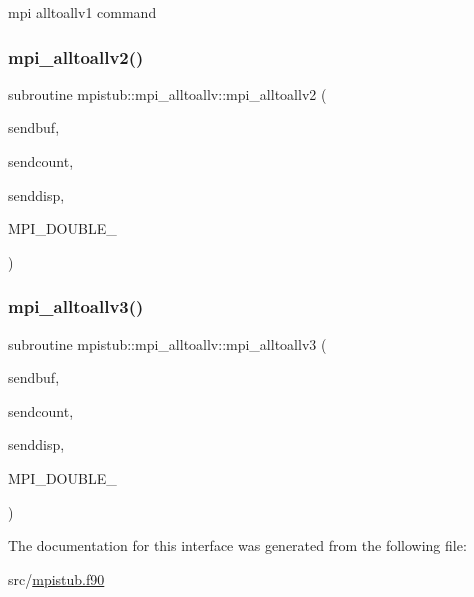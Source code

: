 mpi alltoallv1 command 

\mbox{\label{interfacempistub_1_1mpi__alltoallv_aa4b7552839c6f8cf7f1305392fac3d35}} 
\subsubsection{\texorpdfstring{mpi\_alltoallv2()}{mpi\_alltoallv2()}}
{\footnotesize\ttfamily subroutine mpistub\+::mpi\+\_\+alltoallv\+::mpi\+\_\+alltoallv2 (\begin{DoxyParamCaption}\item[{double precision, dimension(\+:)}]{sendbuf,  }\item[{integer, dimension(\+:)}]{sendcount,  }\item[{integer, dimension(\+:)}]{senddisp,  }\item[{}]{M\+P\+I\+\_\+\+D\+O\+U\+B\+L\+E\+\_\+ }\end{DoxyParamCaption})}

\mbox{\label{interfacempistub_1_1mpi__alltoallv_a0772d04d3569130dbea35245d97cfae7}} 
\subsubsection{\texorpdfstring{mpi\_alltoallv3()}{mpi\_alltoallv3()}}
{\footnotesize\ttfamily subroutine mpistub\+::mpi\+\_\+alltoallv\+::mpi\+\_\+alltoallv3 (\begin{DoxyParamCaption}\item[{integer, dimension(\+:)}]{sendbuf,  }\item[{integer, dimension(\+:)}]{sendcount,  }\item[{integer, dimension(\+:)}]{senddisp,  }\item[{}]{M\+P\+I\+\_\+\+D\+O\+U\+B\+L\+E\+\_\+ }\end{DoxyParamCaption})}



The documentation for this interface was generated from the following file\+:\begin{DoxyCompactItemize}
\item 
src/\mbox{\hyperlink{mpistub_8f90}{mpistub.\+f90}}\end{DoxyCompactItemize}
